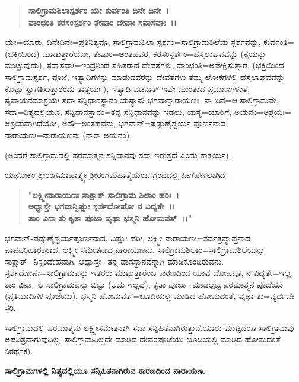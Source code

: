 \begin{verse}
\textbf{ಸಾಲಿಗ್ರಾಮಶಿಲಾಸ್ಪರ್ಶಂ ಯೇ ಕುರ್ವಂತಿ ದಿನೇ ದಿನೇ~।} \\\textbf{ವಾಂಛಂತಿ ಕರಸಂಸ್ಪರ್ಶಂ ತೇಷಾಂ ದೇವಾಃ ಸವಾಸವಾಃ~।।}
\end{verse}

ಯೇ=ಯಾರು, ದಿನೇದಿನೇ=ಪ್ರತಿನಿತ್ಯವೂ, ಸಾಲಿಗ್ರಾಮಶಿಲಾ ಸ್ಪರ್ಶಂ=ಸಾಲಿಗ್ರಾಮ\-ಶಿಲೆಯ ಸ್ಪರ್ಶವನ್ನು, ಕುರ್ವಂತಿ=(ಭಕ್ತಿಯಿಂದ) ಮಾಡುತ್ತಾರೆಯೋ, ತೇಷಾಂ=ಅಂತಹವರ, ಕರಸಂಸ್ಪರ್ಶಂ=ಹಸ್ತಲಾಘವವನ್ನು (ಕೈಯನ್ನು ಮುಟ್ಟುವುದು), ಸವಾಸವಾಃ=ಇಂದ್ರನಿಂದ ಸಹಿತರಾದ ದೇವತೆಗಳು, ವಾಂಛಂತಿ=ಅಪೇಕ್ಷಿಸುತ್ತಾರೆ. (ಭಕ್ತಿಯಿಂದ ಸಾಲಿಗ್ರಾಮಸ್ಪರ್ಶ, ಪೂಜೆ, ಇತ್ಯಾದಿಗಳನ್ನು ಮಾಡುವವರನ್ನು ದೇವತೆಗಳು ತಮ್ಮ ಲೋಕಗಳಲ್ಲಿ ಹಸ್ತಲಾಘವವನ್ನು ಕೊಟ್ಟು ಸ್ವಾಗತಿಸುತ್ತಾರೆಂದು ತಾತ್ಪರ್ಯ), ಇತ್ಯಾದಿ ವಚನಾತ್-ಇವೇ ಮುಂತಾದ ಪ್ರಮಾಣಗಳಂತೆ, ಸೈವಾಯನಮಾಶ್ರಯಃ ಸದಾ ಸನ್ನಿಧಾನಸ್ಥಾನಂ ಯಸ್ಯಾಸೌ ಭಗವಾನ್ನಾರಾಯಣಃ- ಸಾ ಏವ=ಆ ಸಾಲಿಗ್ರಾಮವೇ, ಸದಾ=ನಿತ್ಯದಲ್ಲಿಯೂ, ಸನ್ನಿಧಾನಸ್ಥಾನಂ=ತನ್ನ ಸನ್ನಿಧಾನವನ್ನು ಇಡಲು, ಯಸ್ಯ=ಯಾರಿಗೆ, ಅಯನಂ=ಆಶ್ರಯಃ= ಆಶ್ರಯವಾಗಿದೆಯೋ, ಅಸೌ=ಅಂತಹವನು, ಭಗವಾನ್=ಷಡ್ಗುಣೈಶ್ವರ್ಯ ಪೂರ್ಣನಾದ, ನಾರಾಯಣಃ=ನಾರಾ\-ಯಣನು (ನಾರಾ ಅಯನಂ).

(ಅಂದರೆ ಸಾಲಿಗ್ರಾಮದಲ್ಲಿ ಪರಮಾತ್ಮನ ಸನ್ನಿಧಾನವು ಸದಾ ಇರುತ್ತದೆ ಎಂದು ತಾತ್ಪರ್ಯ).

ಯಥೋಕ್ತಂ ಶ‍್ರೀರಂಗಮಾಹಾತ್ಮ್ಯೇ-ಶ‍್ರೀರಂಗಮಹಾತ್ಮೆಯೆಂಬ ಗ್ರಂಥದಲ್ಲಿ ಹೀಗೆ\break ಹೇಳಲಾಗಿದೆ-

\begin{verse}
\textbf{"ಲಕ್ಷ್ಮೀನಾರಾಯಣಃ ಸಾಕ್ಷಾತ್ ಸಾಲಿಗ್ರಾಮ ಶಿಲಾಂ ಹರಿಃ~।}\\\textbf{ಅಧ್ಯಾಸ್ತೇ ಭಗವಾನ್ವಿಷ್ಣುಃ ಸ್ಪರ್ಶದೋಷೋ ನ ವಿದ್ಯತೇ~।।}\\\textbf{ತಾಂ ವಿನಾ ತು ಕೃತಾ ಪೂಜಾ ವೃಥಾ ಭಸ್ಮನಿ ಹೋಮವತ್~।।"}
\end{verse}


ಭಗವಾನ್-ಷಡ್ಗುಣೈಶ್ವರ್ಯಪೂರ್ಣನಾದ, ವಿಷ್ಣುಃ ಹರಿಃ, ಲಕ್ಷ್ಮೀ ನಾರಾಯಣಃ=\break ಸರ್ವತ್ರವ್ಯಾಪ್ತನಾದ, ಪಾಪಪರಿಹಾರಕನಾದ, ಲಕ್ಷ್ಮೀ ಸಮೇತನಾದ ನಾರಾಯಣನು, ಸಾಲಿಗ್ರಾಮಶಿಲಾಂ=ಸಾಲಿಗ್ರಾಮಶಿಲೆಯನ್ನು ಸಾಕ್ಷಾತ್=ನಿಸ್ಸಂದೇಹವಾಗಿ, ಅಧ್ಯಾಸ್ತೇ=ತನ್ನ ವಾಸ\-ಸ್ಥಾನವನ್ನಾಗಿ ಮಾಡಿಕೊಂಡಿರುವನು. ಸ್ಪರ್ಶದೋಷಃ=ಸಾಲಿಗ್ರಾಮವನ್ನು ಇತರರು ಮುಟ್ಟು\-ತ್ತಾರೆಂಬ ಕಾರಣದಿಂದ ಯಾವ ದೋಷವೂ, ನ ವಿದ್ಯತೇ=ಇಲ್ಲ. ತಾಂ ವಿನಾ=ಆ ಸಾಲಿಗ್ರಾಮವನ್ನು ಬಿಟ್ಟು (ಅದು ಇಲ್ಲದೆ), ಕೃತಾ ಪೂಜಾ=ಮಾಡಲ್ಪಟ್ಟ ಪರಮಾತ್ಮನ ಪೂಜೆಯು (ಪ್ರತಿಮಾದಿಗಳ ಪೂಜೆಯು), ಭಸ್ಮನಿ ಹೋಮವತ್=ಬೂದಿಯಲ್ಲಿ ಮಾಡಿದ ಹೋಮದಂತೆ, ವೃಥಾ ತು=ವ್ಯರ್ಥವೇ ಸರಿ.

ಸಾಲಿಗ್ರಾಮದಲ್ಲಿ ಪರಮಾತ್ಮನು ಲಕ್ಷ್ಮೀಸಮೇತನಾಗಿ ಸದಾ ಸನ್ನಿಹಿತನಾಗಿರುತ್ತಾನೆ.\break ಯಾರು ಮುಟ್ಟಿದರೂ ಸಾಲಿಗ್ರಾಮವು ಅಪವಿತ್ರವಾಗುವುದಿಲ್ಲ. ಸಾಲಿಗ್ರಾಮವಿಲ್ಲದೇ ಮಾಡಿದ ದೇವರಪೂಜೆಯು ಬೂದಿಯಲ್ಲಿ ಮಾಡಿದ ಹೋಮದಂತೆ ನಿರರ್ಥಕ).

\begin{center}
\textbf{ಸಾಲಿಗ್ರಾಮಗಳಲ್ಲಿ ನಿತ್ಯದಲ್ಲಿಯೂ ಸನ್ನಿಹಿತನಾಗಿರುವ ಕಾರಣದಿಂದ ನಾರಾಯಣ.}
\end{center}

